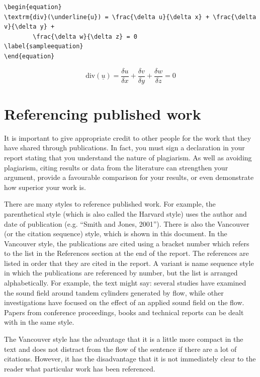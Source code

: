 {\footnotesize
\begin{verbatim}
\begin{equation}
\textrm{div}(\underline{u}) = \frac{\delta u}{\delta x} + \frac{\delta v}{\delta y} +
        \frac{\delta w}{\delta z} = 0
\label{sampleequation}
\end{equation} 
\end{verbatim}
}

\begin{equation}
\textrm{div}(\underline{u}) = \frac{\delta u}{\delta x} + \frac{\delta v}{\delta y} + \frac{\delta w}{\delta z} = 0
\label{sampleequation}
\end{equation} 

\section{Referencing published work}
It is important to give appropriate credit to other people for the work that they have shared through publications. In fact, you must sign a declaration in your report stating that you understand the nature of plagiarism. As well as avoiding plagiarism, citing results or data from the literature can strengthen your argument, provide a favourable comparison for your results, or even demonstrate how superior your work is.

There are many styles to reference published work. For example, the parenthetical style (which is also called the Harvard style) uses the author and date of publication (e.g. ``Smith and Jones, 2001''). There is also the Vancouver (or the citation sequence) style, which is shown in this document. In the Vancouver style, the publications are cited using a bracket number which refers to the list in the References section at the end of the report. The references are listed in order that they are cited in the report. A variant is name sequence style in which the publications are referenced by number, but the list is arranged alphabetically. For example, the text might say: several studies have examined the sound field around tandem cylinders generated by flow\cite{fitzpatrick2003flow,finnegan2010experimental}, while other investigations have focused on the effect of an applied sound field on the flow\cite{hall2003vortex}. Papers from conference proceedings\cite{jordan2001array}, books\cite{paidoussis2010fluid} and technical reports\cite{reyes2007power,iea2011} can be dealt with in the same style.

The Vancouver style has the advantage that it is a little more compact in the text and does not distract from the flow of the sentence if there are a lot of citations. However, it has the disadvantage that it is not immediately clear to the reader what particular work has been referenced.


